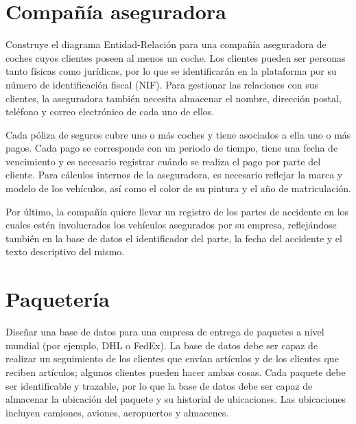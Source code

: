 \documentclass[a4paper]{article}
\begin{document}
\section{Compañía aseguradora}
Construye el diagrama Entidad-Relación para una compañía aseguradora de coches cuyos clientes poseen al menos un coche. Los clientes pueden ser personas tanto físicas como jurídicas, por lo que se identificarán en la plataforma por su número de identificación fiscal (NIF). Para gestionar las relaciones con sus clientes, la aseguradora también necesita almacenar el nombre, dirección postal, teléfono y correo electrónico de cada uno de ellos.

Cada póliza de seguros cubre uno o más coches y tiene asociados a ella uno o más pagos. Cada pago se corresponde con un periodo de tiempo, tiene una fecha de vencimiento y es necesario registrar cuándo se realiza el pago por parte del cliente. Para cálculos internos de la aseguradora, es necesario reflejar la marca y modelo de los vehículos, así como el color de su pintura y el año de matriculación.

Por último, la compañía quiere llevar un registro de los partes de accidente en los cuales estén involucrados los vehículos asegurados por su empresa, reflejándose también en la base de datos el identificador del parte, la fecha del accidente y el texto descriptivo del mismo.

\section{Paquetería}
Diseñar una base de datos para una empresa de entrega de paquetes a nivel mundial (por ejemplo, DHL o FedEx). La base de datos debe ser capaz de realizar un seguimiento de los clientes que envían artículos y de los clientes que reciben artículos; algunos clientes pueden hacer ambas cosas. Cada paquete debe ser identificable y trazable, por lo que la base de datos debe ser capaz de almacenar la ubicación del paquete y su historial de ubicaciones. Las ubicaciones incluyen camiones, aviones, aeropuertos y almacenes.
\end{document}
